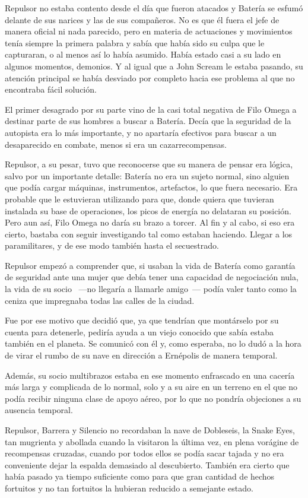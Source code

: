 \parbreak
Repulsor no estaba contento desde el día que fueron atacados y Batería se esfumó delante de sus narices y las de sus compañeros. No es que él fuera el jefe de manera oficial ni nada parecido, pero en materia de actuaciones y movimientos tenía siempre la primera palabra y sabía que había sido su culpa que le capturaran, o al menos así lo había asumido. Había estado casi a su lado en algunos momentos, demonios. Y al igual que a John Scream le estaba pasando, su atención principal se había desviado por completo hacia ese problema al que no encontraba fácil solución.

El primer desagrado por su parte vino de la casi total negativa de Filo Omega a destinar parte de sus hombres a buscar a Batería. Decía que la seguridad de la autopista era lo más importante, y no apartaría efectivos para buscar a un desaparecido en combate, menos si era un cazarrecompensas.

Repulsor, a su pesar, tuvo que reconocerse que su manera de pensar era lógica, salvo por un importante detalle: Batería no era un sujeto normal, sino alguien que podía cargar máquinas, instrumentos, artefactos, lo que fuera necesario. Era probable que le estuvieran utilizando para que, donde quiera que tuvieran instalada su base de operaciones, los picos de energía no delataran su posición. Pero aun así, Filo Omega no daría su brazo a torcer. Al fin y al cabo, si eso era cierto, bastaba con seguir investigando tal como estaban haciendo. Llegar a los paramilitares, y de ese modo también hasta el secuestrado.

Repulsor empezó a comprender que, si usaban la vida de Batería como garantía de seguridad ante una mujer que debía tener una capacidad de negociación nula, la vida de su socio ~---no llegaría a llamarle amigo~--- podía valer tanto como la ceniza que impregnaba todas las calles de la ciudad.

Fue por ese motivo que decidió que, ya que tendrían que montárselo por su cuenta para detenerle, pediría ayuda a un viejo conocido que sabía estaba también en el planeta. Se comunicó con él y, como esperaba, no lo dudó a la hora de virar el rumbo de su nave en dirección a Ernépolis de manera temporal.

Además, su socio multibrazos estaba en ese momento enfrascado en una cacería más larga y complicada de lo normal, solo y a su aire en un terreno en el que no podía recibir ninguna clase de apoyo aéreo, por lo que no pondría objeciones a su ausencia temporal.

\parbreak
Repulsor, Barrera y Silencio no recordaban la nave de Dobleseis, la Snake Eyes, tan mugrienta y abollada cuando la visitaron la última vez, en plena vorágine de recompensas cruzadas, cuando por todos ellos se podía sacar tajada y no era conveniente dejar la espalda demasiado al descubierto. También era cierto que había pasado ya tiempo suficiente como para que gran cantidad de hechos fortuitos y no tan fortuitos la hubieran reducido a semejante estado.

